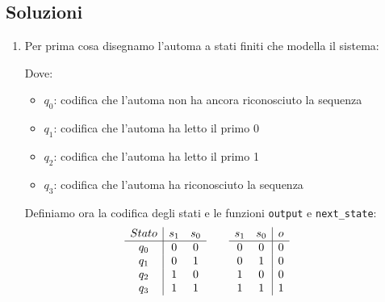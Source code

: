 \documentclass{article}
\begin{document}
\subsection{Soluzioni}
\begin{enumerate}

\item Per prima cosa disegnamo l'automa a stati finiti che modella il sistema:
\begin{center}
\end{center}
Dove:
\begin{itemize}
    \item $q_0$: codifica che l'automa non ha ancora riconosciuto la sequenza
    \item $q_1$: codifica che l'automa ha letto il primo 0
    \item $q_2$: codifica che l'automa ha letto il primo 1
    \item $q_3$: codifica che l'automa ha riconosciuto la sequenza
\end{itemize}
Definiamo ora la codifica degli stati e le funzioni \texttt{output} e \texttt{next\_state}:
\begin{equation*}
    \begin{array}{c c c c c}
        \begin{array}{c|c c}
        Stato & s_1 & s_0\\
        \hline
        q_0 & 0 & 0\\
        q_1 & 0 & 1\\
        q_2 & 1 & 0\\
        q_3 & 1 & 1\\
        \end{array}
        &      &
        
        \begin{array}{c c|c}
        s_1 & s_0 & o\\
        \hline
        0 & 0 & 0\\
        0 & 1 & 0\\
        1 & 0 & 0\\
        1 & 1 & 1\\
        \end{array}
        &      &
        

\end{array}
\end{equation*}
\end{enumerate}
\end{document}
